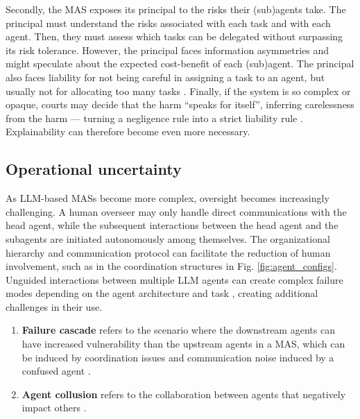 \documentclass[11pt]{article}
\begin{document}
Secondly, the MAS exposes its principal to the risks their (sub)agents take.  The principal must understand the risks associated with each task and with each agent.  Then, they must assess which tasks can be delegated without surpassing its risk tolerance.  However, the principal faces information asymmetries and might speculate about the expected cost-benefit of each (sub)agent. The principal also faces liability for not being careful in assigning a task to an agent, but usually not for allocating too many tasks \citep{carbonara2016sharing}. Finally, if the system is so complex or opaque, courts may decide that the harm ``speaks for itself'', inferring carelessness from the harm --- turning a negligence rule into a strict liability rule \citep{fraser2022ai, casey2019robot}.  Explainability can therefore become even more necessary.

\subsection{Operational uncertainty}

As LLM-based MASs become more complex, oversight becomes increasingly challenging.  A human overseer may only handle direct communications with the head agent, while the subsequent interactions between the head agent and the subagents are initiated autonomously among themselves. The organizational hierarchy and communication protocol can facilitate the reduction of human involvement, such as in the coordination structures in Fig. \ref{fig:agent_configs}. Unguided interactions between multiple LLM agents can create complex failure modes depending on the agent architecture and task \citep{pan_whymas_2025}, creating additional challenges in their use.
\begin{enumerate}[wide, labelindent=0pt, itemsep=-1pt, topsep=1pt]
    \item[\textbullet] \textbf{Failure cascade} refers to the scenario where the downstream agents can have increased vulnerability than the upstream agents in a MAS, which can be induced by coordination issues \citep{peigne-lefebvre_mas_2025} and communication noise induced by a confused agent \citep{barbi_preventing_2025}.
    \item[\textbullet] \textbf{Agent collusion} refers to the collaboration between agents that negatively impact others \citep{fish_algorithmic_2024,lin_strategic_2024}.
\end{enumerate}
\end{document}
